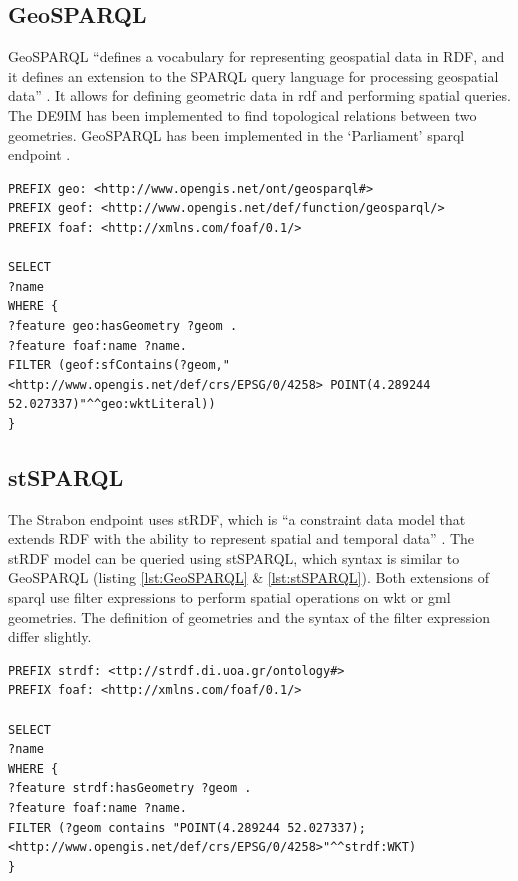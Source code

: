 \subsection{GeoSPARQL}
GeoSPARQL \enquote{defines a vocabulary for representing geospatial data in RDF, and it defines an extension to the SPARQL query language for processing geospatial data} \cite[p. xvi]{LD:OGC}. It allows for defining geometric data in \ac{rdf} and performing spatial queries. The \ac{DE9IM} \citep{GIS:9IM} has been implemented to find topological relations between two geometries. GeoSPARQL has been implemented in the `Parliament' \ac{sparql} endpoint \citep{LD:GeoSPARQL}. 

\begin{lstlisting}[caption={A GeoSPARQL query to find the names of features that contain a point geometry}, label={lst:GeoSPARQL}]
PREFIX geo: <http://www.opengis.net/ont/geosparql#>
PREFIX geof: <http://www.opengis.net/def/function/geosparql/>
PREFIX foaf: <http://xmlns.com/foaf/0.1/> 

SELECT 
?name
WHERE {
?feature geo:hasGeometry ?geom .
?feature foaf:name ?name.
FILTER (geof:sfContains(?geom,"<http://www.opengis.net/def/crs/EPSG/0/4258> POINT(4.289244 52.027337)"^^geo:wktLiteral))
}
\end{lstlisting}

\subsection{stSPARQL}
\label{par:stSPARQL}
The Strabon endpoint uses stRDF, which is \enquote{a constraint data model that extends RDF with the ability to represent spatial and temporal data} \cite[p. 425]{SSW:Koubarakis}. The stRDF model can be queried using stSPARQL, which syntax is similar to GeoSPARQL (listing \ref{lst:GeoSPARQL} \& \ref{lst:stSPARQL}). Both extensions of \ac{sparql} use filter expressions to perform spatial operations on \ac{wkt} or \ac{gml} geometries. The definition of geometries and the syntax of the filter expression differ slightly.

\begin{lstlisting}[caption={A stSPARQL query to find the names of features that contain a point geometry}, label={lst:stSPARQL}]
PREFIX strdf: <ttp://strdf.di.uoa.gr/ontology#>
PREFIX foaf: <http://xmlns.com/foaf/0.1/> 

SELECT 
?name
WHERE {
?feature strdf:hasGeometry ?geom .
?feature foaf:name ?name.
FILTER (?geom contains "POINT(4.289244 52.027337);<http://www.opengis.net/def/crs/EPSG/0/4258>"^^strdf:WKT)
}
\end{lstlisting}

